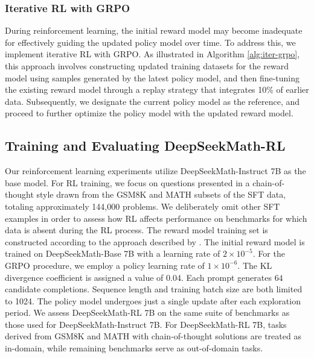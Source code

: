 \begin{itemize}[topsep=0pt]
\begin{itemize}[topsep=0pt]
\subsubsection{Iterative RL with GRPO} During reinforcement learning, the initial reward model may become inadequate for effectively guiding the updated policy model over time. To address this, we implement iterative RL with GRPO. As illustrated in Algorithm \ref{alg:iter-grpo}, this approach involves constructing updated training datasets for the reward model using samples generated by the latest policy model, and then fine-tuning the existing reward model through a replay strategy that integrates 10\% of earlier data. Subsequently, we designate the current policy model as the reference, and proceed to further optimize the policy model with the updated reward model.

\subsection{Training and Evaluating DeepSeekMath-RL}

Our reinforcement learning experiments utilize DeepSeekMath-Instruct 7B as the base model. For RL training, we focus on questions presented in a chain-of-thought style drawn from the GSM8K and MATH subsets of the SFT data, totaling approximately 144,000 problems. We deliberately omit other SFT examples in order to assess how RL affects performance on benchmarks for which data is absent during the RL process. The reward model training set is constructed according to the approach described by \citep{wang2023math}. The initial reward model is trained on DeepSeekMath-Base 7B with a learning rate of $2 \times 10^{-5}$. For the GRPO procedure, we employ a policy learning rate of $1 \times 10^{-6}$. The KL divergence coefficient is assigned a value of 0.04. Each prompt generates $64$ candidate completions. Sequence length and training batch size are both limited to 1024. The policy model undergoes just a single update after each exploration period. We assess DeepSeekMath-RL 7B on the same suite of benchmarks as those used for DeepSeekMath-Instruct 7B. For DeepSeekMath-RL 7B, tasks derived from GSM8K and MATH with chain-of-thought solutions are treated as in-domain, while remaining benchmarks serve as out-of-domain tasks.


\end{itemize}
\end{itemize}

